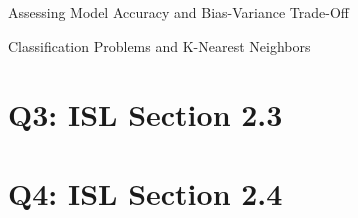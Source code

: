 \documentclass{beamer}
\begin{document}
\begin{frame}{Assessing Model Accuracy and Bias-Variance Trade-Off}
	\begin{itemize}[<+->]
	
	\end{itemize}
\end{frame}

\begin{frame}{Classification Problems and K-Nearest Neighbors}
	\begin{itemize}[<+->]
	
	\end{itemize}
\end{frame}

\section[Q3]{Q3: ISL Section 2.3}
\section[Q4]{Q4: ISL Section 2.4}
\end{document}
